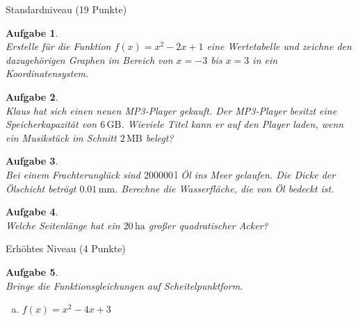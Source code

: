 \documentclass[12pt,fleqn]{article}
\theoremstyle{aufg}
\newtheorem{aufgabe}{Aufgabe}
\theoremstyle{bsp}
\begin{document}
\begin{flushleft}
 \clearpage 
\begin{center} \begin{framed} Standardniveau (19 Punkte) \end{framed} \end{center}\begin{aufgabe} ~ \\ 
Erstelle f\"ur die Funktion $f(x)=x^{2} - 2 x + 1$ eine Wertetabelle und zeichne den dazugeh\"origen Graphen im Bereich von $x=-3$ bis $x=3$ in ein Koordinatensystem. \\ 
\end{aufgabe} 
\begin{aufgabe} ~ \\ 
Klaus hat sich einen neuen MP3-Player gekauft. Der MP3-Player besitzt eine Speicherkapazit\"at von $6\mathrm{\,GB}$. Wieviele Titel kann er auf den Player laden, wenn ein Musikst\"uck im Schnitt $2\mathrm{\,MB}$ belegt? 
\end{aufgabe} 
\begin{aufgabe} ~ \\ 
Bei einem Frachterungl\"uck sind $200000\mathrm{\,l}$ \"Ol ins Meer gelaufen. Die Dicke der \"Olschicht betr\"agt $0.01\mathrm{\,mm}$. Berechne die Wasserfl\"ache, die von \"Ol bedeckt ist.
\end{aufgabe} 
\begin{aufgabe} ~ \\ 
Welche Seitenl\"ange hat ein $20\mathrm{\,ha}$ gro\ss{}er quadratischer Acker?
\end{aufgabe} 
\begin{center} \begin{framed} Erh\"ohtes Niveau (4 Punkte) \end{framed} \end{center}\begin{aufgabe} ~ \\ 
Bringe die Funktionsgleichungen auf Scheitelpunktform. \\ 
\begin{multicols}{3} 
\begin{enumerate}[a)] 
\item 
$f(x)=x^{2} - 4 x + 3$
\end{enumerate} 
\end{multicols} 
\end{aufgabe} 
\end{flushleft} 
    
\end{document}
